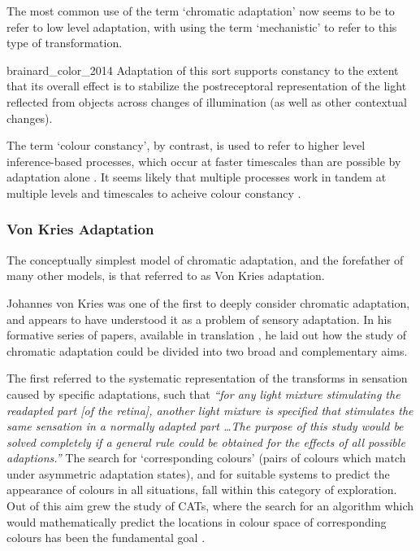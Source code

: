 The most common use of the term `chromatic adaptation' now seems to be to refer to low level adaptation, with \citet{brainard_color_2014} using the term `mechanistic' to refer to this type of transformation.

\begin{citequote}{brainard_color_2014}
Adaptation of this sort supports constancy to the extent that its overall effect is to stabilize the postreceptoral representation of the light reflected from objects across changes of illumination (as well as other contextual changes).
\end{citequote}

The term `colour constancy', by contrast, is used to refer to higher level inference-based processes, which occur at faster timescales than are possible by adaptation alone \citep{rinner_time_2000}. It seems likely that multiple processes work in tandem at multiple levels and timescales to acheive colour constancy \citep{hurlbert_colour_2007}.

\subsubsection{Von Kries Adaptation}

The conceptually simplest model of chromatic adaptation, and the forefather of many other models, is that referred to as Von Kries adaptation.

Johannes von Kries was one of the first to deeply consider chromatic adaptation, and appears to have understood it as a problem of sensory adaptation. In his formative series of papers, available in translation \citep{von_kries_beitrag_1970}, he laid out how the study of chromatic adaptation could be divided into two broad and complementary aims. 

The first referred to the systematic representation of the transforms in sensation caused by specific adaptations, such that \textit{``for any light mixture stimulating the readapted part [of the retina], another light mixture is specified that stimulates the same sensation in a normally adapted part \dots The purpose of this study would be solved completely if a general rule could be obtained for the effects of all possible adaptions.''} The search for `corresponding colours' (pairs of colours which match under asymmetric adaptation states), and for suitable systems to predict the appearance of colours in all situations, fall within this category of exploration. Out of this aim grew the study of \glspl{CAT}, where the search for an algorithm which would mathematically predict the locations in colour space of corresponding colours has been the fundamental goal \citep{cie_tc_1-52_cie_2004}.

